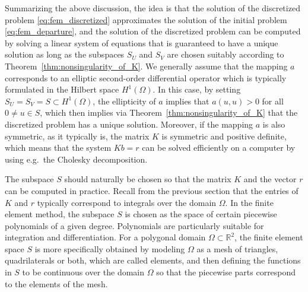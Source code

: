\documentclass[english, 12pt, a4paper, sci, utf8, a-2b, online]{aaltothesis}
\theoremstyle{definition}
\theoremstyle{plain}
\numberwithin{equation}{section}
\begin{document}
Summarizing the above discussion,
the idea is that the solution of the discretized problem \eqref{eq:fem_discretized}
approximates the solution of the initial problem \eqref{eq:fem_departure},
and the solution of the discretized problem can be computed
by solving a linear system of equations that is guaranteed to have a unique solution
as long as the subspaces $S_U$ and $S_V$ are chosen suitably according to
Theorem~\ref{thm:nonsingularity_of_K}.
We generally assume that the mapping $a$ corresponds to an elliptic second-order
differential operator which is typically formulated in the Hilbert space $H^1(\Omega)$.
In this case, by setting $S_U = S_V = S \subset H^1(\Omega)$,
the ellipticity of $a$ implies that $a(u,u) > 0$ for all $0 \neq u \in S$,
which then implies via Theorem~\ref{thm:nonsingularity_of_K} that
the discretized problem has a unique solution. Moreover, if the mapping $a$
is also symmetric, as it typically is, the matrix $K$ is symmetric and
positive definite, which means that the system $Kb = r$ can be solved efficiently
on a computer by using e.g.\ the Cholesky decomposition.

The subspace $S$ should naturally be chosen so that
the matrix $K$ and the vector $r$ can be computed in practice.
Recall from the previous section that the entries of $K$ and $r$ typically
correspond to integrals over the domain $\Omega$.
In the finite element method, the subspace $S$ is chosen as the space of
certain piecewise polynomials of a given degree.
Polynomials are particularly suitable for integration and differentiation.
For a polygonal domain $\Omega \subset \mathbb{R}^2$,
the finite element space $S$ is more specifically obtained by modeling $\Omega$
as a mesh of triangles, quadrilaterals or both, which are called elements,
and then defining the functions in $S$ to be continuous over the domain $\Omega$ so that
the piecewise parts correspond to the elements of the mesh.
\end{document}
